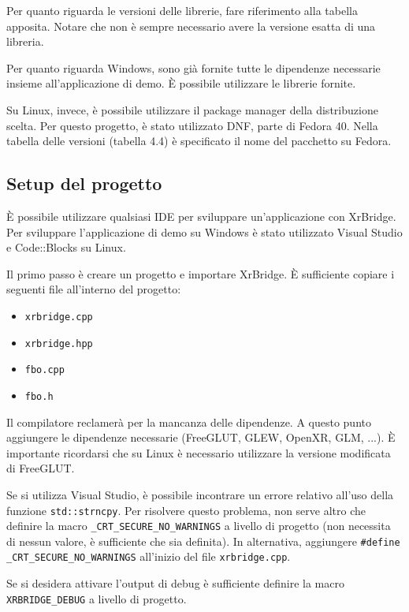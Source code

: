 \documentclass[twoside]{supsistudent}
\begin{document}
Per quanto riguarda le versioni delle librerie, fare riferimento alla tabella apposita. Notare che non è sempre necessario avere la versione esatta di una libreria.

Per quanto riguarda Windows, sono già fornite tutte le dipendenze necessarie insieme all'applicazione di demo. È possibile utilizzare le librerie fornite.

Su Linux, invece, è possibile utilizzare il package manager della distribuzione scelta. Per questo progetto, è stato utilizzato DNF, parte di Fedora 40. Nella tabella delle versioni (tabella 4.4) è specificato il nome del pacchetto su Fedora.

\subsection{Setup del progetto}

È possibile utilizzare qualsiasi IDE per sviluppare un'applicazione con XrBridge. Per sviluppare l'applicazione di demo su Windows è stato utilizzato Visual Studio e Code::Blocks su Linux.

Il primo passo è creare un progetto e importare XrBridge. È sufficiente copiare i seguenti file all'interno del progetto:

\begin{itemize}
  \item \texttt{xrbridge.cpp}
  \item \texttt{xrbridge.hpp}
  \item \texttt{fbo.cpp}
  \item \texttt{fbo.h}
\end{itemize}

Il compilatore reclamerà per la mancanza delle dipendenze. A questo punto aggiungere le dipendenze necessarie (FreeGLUT, GLEW, OpenXR, GLM, ...). È importante ricordarsi che su Linux è necessario utilizzare la versione modificata di FreeGLUT.

Se si utilizza Visual Studio, è possibile incontrare un errore relativo all'uso della funzione \texttt{std::strncpy}. Per risolvere questo problema, non serve altro che definire la macro \texttt{\_CRT\_SECURE\_NO\_WARNINGS} a livello di progetto (non necessita di nessun valore, è sufficiente che sia definita). In alternativa, aggiungere \texttt{\#define \_CRT\_SECURE\_NO\_WARNINGS} all'inizio del file \texttt{xrbridge.cpp}.

Se si desidera attivare l'output di debug è sufficiente definire la macro \texttt{XRBRIDGE\_DEBUG} a livello di progetto.
\end{document}
